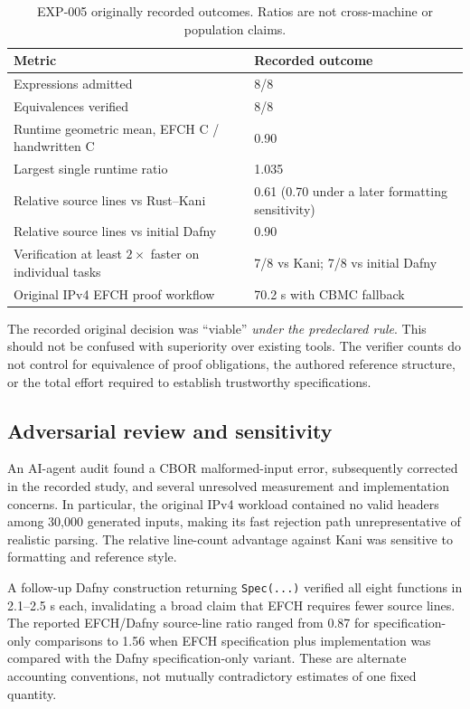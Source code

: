 \documentclass[10pt,twocolumn]{article}
\begin{document}
\begin{table}[t]
\centering\small
\caption{EXP-005 originally recorded outcomes. Ratios are not cross-machine or population claims.}\label{tab:exp005}
\begin{tabularx}{\columnwidth}{@{}p{}X@{}}
\toprule Metric & Recorded outcome \\ \midrule
Expressions admitted & 8/8 \\
Equivalences verified & 8/8 \\
Runtime geometric mean, EFCH C / handwritten C & 0.90 \\
Largest single runtime ratio & 1.035 \\
Relative source lines vs Rust--Kani & 0.61 (0.70 under a later formatting sensitivity) \\
Relative source lines vs initial Dafny & 0.90 \\
Verification at least $2\times$ faster on individual tasks & 7/8 vs Kani; 7/8 vs initial Dafny \\
Original IPv4 EFCH proof workflow & 70.2 s with CBMC fallback \\
\bottomrule
\end{tabularx}
\end{table}

The recorded original decision was ``viable'' \emph{under the predeclared rule}. This should not be confused with superiority over existing tools. The verifier counts do not control for equivalence of proof obligations, the authored reference structure, or the total effort required to establish trustworthy specifications.

\subsection{Adversarial review and sensitivity}
An AI-agent audit found a CBOR malformed-input error, subsequently corrected in the recorded study, and several unresolved measurement and implementation concerns. In particular, the original IPv4 workload contained no valid headers among 30,000 generated inputs, making its fast rejection path unrepresentative of realistic parsing. The relative line-count advantage against Kani was sensitive to formatting and reference style.

A follow-up Dafny construction returning \texttt{Spec(...)} verified all eight functions in 2.1--2.5 s each, invalidating a broad claim that EFCH requires fewer source lines. The reported EFCH/Dafny source-line ratio ranged from 0.87 for specification-only comparisons to 1.56 when EFCH specification plus implementation was compared with the Dafny specification-only variant. These are alternate accounting conventions, not mutually contradictory estimates of one fixed quantity.
\end{document}
